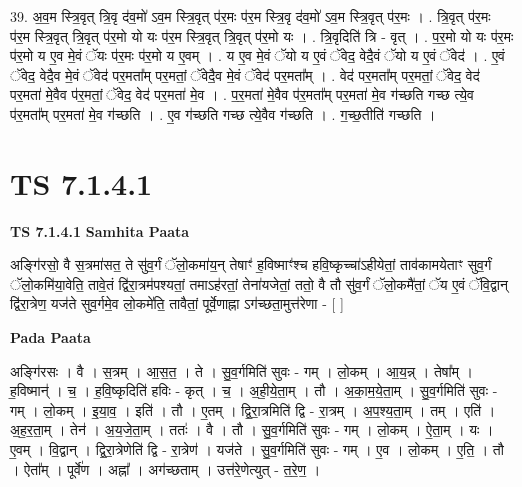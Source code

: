 \documentclass[17pt]{extarticle}
\begin{document}
39. अ॒व॒म स्त्रि॒वृत् त्रि॒वृ द॑व॒मो॑ ऽव॒म स्त्रि॒वृत् प॑र॒मः प॑र॒म स्त्रि॒वृ द॑व॒मो॑ ऽव॒म स्त्रि॒वृत् प॑र॒मः । . त्रि॒वृत् प॑र॒मः प॑र॒म स्त्रि॒वृत् त्रि॒वृत् प॑र॒मो यो यः प॑र॒म स्त्रि॒वृत् त्रि॒वृत् प॑र॒मो यः । . त्रि॒वृदिति॑ त्रि - वृत् । . प॒र॒मो यो यः प॑र॒मः प॑र॒मो य ए॒व मे॒वं ॅयः प॑र॒मः प॑र॒मो य ए॒वम् । . य ए॒व मे॒वं ॅयो य ए॒वं ॅवेद॒ वेदै॒वं ॅयो य ए॒वं ॅवेद॑ । . ए॒वं ॅवेद॒ वेदै॒व मे॒वं ॅवेद॑ पर॒मता᳚म् पर॒मतां॒ ॅवेदै॒व मे॒वं ॅवेद॑ पर॒मता᳚म् । . वेद॑ पर॒मता᳚म् पर॒मतां॒ ॅवेद॒ वेद॑ पर॒मता॑ मे॒वैव प॑र॒मतां॒ ॅवेद॒ वेद॑ पर॒मता॑ मे॒व । . प॒र॒मता॑ मे॒वैव प॑र॒मता᳚म् पर॒मता॑ मे॒व ग॑च्छति गच्छ त्ये॒व प॑र॒मता᳚म् पर॒मता॑ मे॒व ग॑च्छति । . ए॒व ग॑च्छति गच्छ त्ये॒वैव ग॑च्छति । . ग॒च्छ॒तीति॑ गच्छति । \newline
\pagebreak
{}

\section{ TS 7.1.4.1 }

\textbf{TS 7.1.4.1 } \newline
\textbf{Samhita Paata} \newline

अङ्गि॑रसो॒ वै स॒त्रमा॑सत॒ ते सु॑व॒र्गं ॅलो॒कमा॑य॒न् तेषाꣳ॑ ह॒विष्माꣳ॑श्च हवि॒ष्कृच्चा॑ऽहीयेतां॒ ताव॑कामयेताꣳ सुव॒र्गं ॅलो॒कमि॑या॒वेति॒ तावे॒तं द्वि॑रा॒त्रम॑पश्यतां॒ तमाऽह॑रतां॒ तेना॑यजेतां॒ ततो॒ वै तौ सु॑व॒र्गं ॅलो॒कमै॑तां॒ ॅय ए॒वं ॅवि॒द्वान् द्वि॑रा॒त्रेण॒ यज॑ते सुव॒र्गमे॒व लो॒कमे॑ति॒ तावैतां॒ पूर्वे॒णाह्ना ऽग॑च्छता॒मुत्त॑रेणा - [  ] \newline

\textbf{Pada Paata} \newline

अङ्गि॑रसः । वै । स॒त्रम् । आ॒स॒त॒ । ते । सु॒व॒र्गमिति॑ सुवः - गम् । लो॒कम् । आ॒य॒न्न् । तेषा᳚म् । ह॒विष्मान्॑ । च॒ । ह॒वि॒ष्कृदिति॑ हविः - कृत् । च॒ । अ॒ही॒ये॒ता॒म् । तौ । अ॒का॒म॒ये॒ता॒म् । सु॒व॒र्गमिति॑ सुवः - गम् । लो॒कम् । इ॒या॒व॒ । इति॑ । तौ । ए॒तम् । द्वि॒रा॒त्रमिति॑ द्वि - रा॒त्रम् । अ॒प॒श्य॒ता॒म् । तम् । एति॑ । अ॒ह॒र॒ता॒म् । तेन॑ । अ॒य॒जे॒ता॒म् । ततः॑ । वै । तौ । सु॒व॒र्गमिति॑ सुवः - गम् । लो॒कम् । ऐ॒ता॒म् । यः । ए॒वम् । वि॒द्वान् । द्वि॒रा॒त्रेणेति॑ द्वि - रा॒त्रेण॑ । यज॑ते । सु॒व॒र्गमिति॑ सुवः - गम् । ए॒व । लो॒कम् । ए॒ति॒ । तौ । ऐता᳚म् । पूर्वे॑ण । अह्ना᳚ । अग॑च्छताम् । उत्त॑रे॒णेत्युत् - त॒रे॒ण॒ ।  \newline
\end{document}
